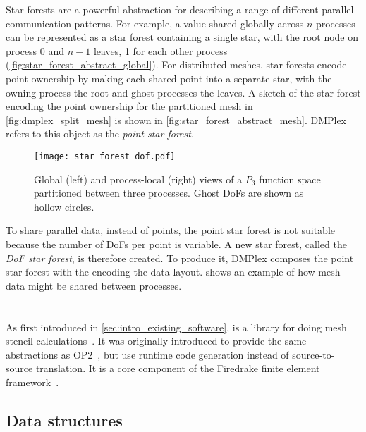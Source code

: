 \documentclass[thesis]{subfiles}
\begin{document}
Star forests are a powerful abstraction for describing a range of different parallel communication patterns.
For example,  a value shared globally across $n$ processes can be represented as a star forest containing a single star, with the root node on process 0 and $n-1$ leaves, 1 for each other process (\cref{fig:star_forest_abstract_global}).
For distributed meshes, star forests encode point ownership by making each shared point into a separate star, with the owning process the root and ghost processes the leaves.
A sketch of the star forest encoding the point ownership for the partitioned mesh in \cref{fig:dmplex_split_mesh} is shown in \cref{fig:star_forest_abstract_mesh}.
DMPlex refers to this object as the \emph{point star forest}.

\begin{figure}
  \centering
  \texttt{[image: star\_forest\_dof.pdf]}

  \caption{
    Global (left) and process-local (right) views of a $P_3$ function space partitioned between three processes.
    Ghost DoFs are shown as hollow circles.
  }
  \label{fig:dmplex_split_function_space}
\end{figure}

To share parallel data, instead of points, the point star forest is not suitable because the number of DoFs per point is variable.
A new star forest, called the \emph{DoF star forest}, is therefore created.
To produce it, DMPlex composes the point star forest with the  encoding the data layout.
 shows an example of how mesh data might be shared between processes.

\section{}


As first introduced in \cref{sec:intro_existing_software},  is a library for doing mesh stencil calculations~\cite{rathgeberPyOP2HighLevelFramework2012}.
It was originally introduced to provide the same abstractions as OP2~\cite{mudaligeOP2ActiveLibrary2012}, but use runtime code generation instead of source-to-source translation.
It is a core component of the Firedrake finite element framework~\cite{FiredrakeUserManual}.

\subsection{Data structures}
\end{document}
